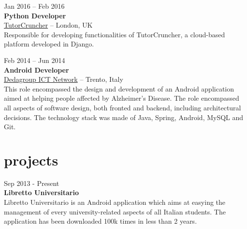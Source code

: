 \documentclass[]{friggeri-cv}
\begin{document}
{Jan 2016 -- Feb 2016} \\
{\textbf{Python Developer}} \\
{\href{http://www.tutorcruncher.com}{TutorCruncher}} -- {London, UK} \\
{Responsible for developing functionalities of TutorCruncher, a cloud-based platform developed in Django.}

{Feb 2014 -- Jun 2014} \\
{\textbf{Android Developer}} \\
{\href{http://www.dedagroup.it}{Dedagroup ICT Network}} -- {Trento, Italy} \\
{This role encompassed the design and development of an Android application aimed at helping people affected by Alzheimer's Disease. The role encompassed all aspects of software design, both fronted and backend, including architectural decisions.
The technology stack was made of Java, Spring, Android, MySQL and Git.}


\section{projects}

{Sep 2013 - Present} \\
{\textbf{Libretto Universitario}} \\
Libretto Universitario is an Android application which aims at easying the management of every university-related aspects of all Italian students. The application has been downloaded 100k times in less than 2 years.




\end{document}
